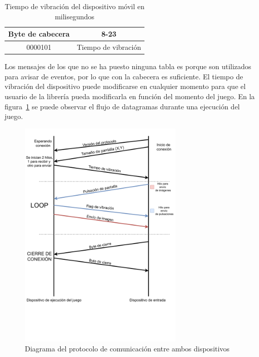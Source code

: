 
\begin{table}[h!]
\centering
\begin{tabular}{|c|c|} 
\hline
Byte de cabecera                                     & 8-23                   \\
\hline
\multicolumn{1}{|c|}{0000101} & \multicolumn{1}{c|}{Tiempo de vibraci\'on}  \\
\hline
\end{tabular}
\caption{Tiempo de vibraci\'on del dispositivo m\'ovil en milisegundos}
\label{table:3}
\end{table}


Los mensajes de los que no se ha puesto ninguna tabla es porque son utilizados para avisar de eventos, por lo que con la cabecera es suficiente. El tiempo de vibraci\'on del dispositivo puede modificarse en cualquier momento para que el usuario de la librer\'ia pueda modificarla en funci\'on del momento del juego. En la figura~\ref{Fig:protocolo} se puede observar el flujo de datagramas durante una ejecuci\'on del juego.\\

\begin{figure}[h]

\centering
\includegraphics[width=0.7\textwidth]{./Imagenes/Vectorial/Arquitectura}
\caption{Diagrama del protocolo de comunicaci\'on entre ambos dispositivos}
\label{Fig:protocolo}
\end{figure}

